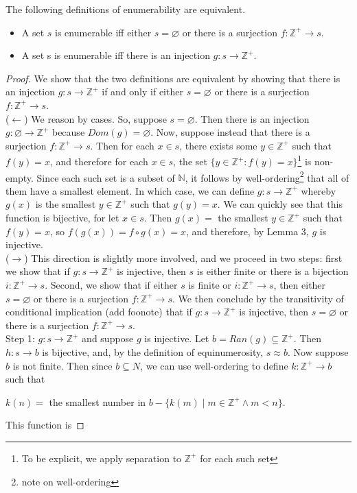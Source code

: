 \documentclass{article}
\begin{document}
\begin{proposition} The following definitions of enumerability are equivalent.
\begin{itemize}
\item A set $s$ is enumerable iff either $s = \varnothing$ or there is a surjection $f : \mathbb{Z^+} \rightarrow s$.
\item A set s is enumerable iff there is an injection $g: s \rightarrow \mathbb{Z^+}$.
\end{itemize}
\end{proposition}
\begin{proof}
We show that the two definitions are equivalent by showing that there is an injection $g: s \rightarrow \mathbb{Z^+}$ if and only if either $s = \varnothing$ or there is a surjection $f : \mathbb{Z^+} \rightarrow s$.\\ ($\leftarrow$) We reason by cases. So, suppose $s = \varnothing$. Then there is an injection $g: \varnothing \rightarrow \mathbb{Z^+}$ because $Dom(g) = \varnothing$. Now, suppose instead that there is a surjection $f: \mathbb{Z^+} \rightarrow s$. Then for each $x \in s$, there exists some $y \in \mathbb{Z^+}$ such that $f(y) = x$, and therefore for each $x \in s$, the set $\{ y \in \mathbb{Z^+} : f(y) = x \}$\footnote[1]{To be explicit, we apply separation to $\mathbb{Z^+}$ for each such set} is non-empty. Since each such set is a subset of $\mathbb{N}$, it follows by well-ordering\footnote[2]{note on well-ordering} that all of them have a smallest element. In which case, we can define $g: s \rightarrow \mathbb{Z^+}$ whereby $g(x)$ is the smallest $y \in \mathbb{Z^+}$ such that $g(y) = x$. We can quickly see that this function is bijective, for let $x \in s$.  Then $g(x) =$ the smallest $y \in \mathbb{Z^+}$ such that $f(y) = x$, so $f(g(x)) = f \circ g(x) = x$, and therefore, by Lemma 3,  $g$ is  injective. \\ ($\rightarrow$) This direction is slightly more involved, and we proceed in two steps: first we show that if $g: s \rightarrow \mathbb{Z^+}$ is injective, then $s$ is either finite or there is a bijection $i: \mathbb{Z^+} \rightarrow s$. Second, we show that if either $s$ is finite or $i: \mathbb{Z^+} \rightarrow s$, then either $s = \varnothing$ or there is a surjection $f:  \mathbb{Z^+} \rightarrow s$. We then conclude by the transitivity of conditional implication (add foonote) that if $g: s \rightarrow \mathbb{Z^+}$ is injective, then  $s = \varnothing$ or there is a surjection $f:  \mathbb{Z^+} \rightarrow s$.\\Step 1: \hspace{0.1cm} $g: s \rightarrow  \mathbb{Z^+}$ and suppose $g$ is injective. Let $b = Ran(g) \subseteq  \mathbb{Z^+}$. Then  $h: s \rightarrow b$ is bijective, and, by the definition of equinumerosity, $s \approx b$. Now suppose $b$ is not finite. Then since $b \subseteq N$, we can use well-ordering to define $k:  \mathbb{Z^+} \rightarrow b$ such that \begin{center} $k(n) =$ the smallest number in $b - \{ k(m) \mid m \in \mathbb{Z^+} \wedge m < n \}$. \end{center} This function is 
\end{proof}
\end{document}
